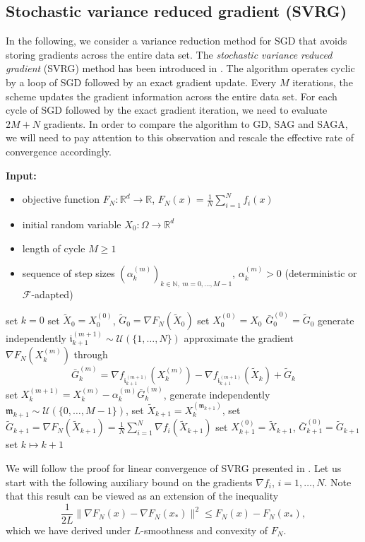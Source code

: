 \documentclass[12pt,openany]{book}
\theoremstyle{definition}
\theoremstyle{definition}
\newcommand{\cU}{\mathcal{U}}
\newcommand{\N}{\mathbb{N}}
\newcommand{\R}{\mathbb{R}}
\begin{document}
\subsection{Stochastic variance reduced gradient (SVRG) }

In the following, we consider a variance reduction method for SGD that avoids storing gradients across the entire data set. The \textit{stochastic variance reduced gradient} (SVRG) method has been introduced in \cite{NIPS2013_ac1dd209}. The algorithm operates cyclic by a loop of SGD followed by an exact gradient update. Every $M$ iterations, the scheme updates the gradient information across the entire data set. For each cycle of SGD followed by the exact gradient iteration, we need to evaluate $2M + N$ gradients. In order to compare the algorithm to GD, SAG and SAGA, we will need to pay attention to this observation and rescale the effective rate of convergence accordingly. 

\begin{algorithm}[htb!]
\begin{algorithmic}[1]
\State \textbf{Input:} \begin{itemize}
 \item objective function $F_N:\R^d\to\R$, $F_N(x) = \frac1N\sum_{i=1}^N f_i(x)$
 \item initial random variable $X_0:\Omega\to\R^d$
 \item length of cycle $M\ge1$
 \item sequence of step sizes $(\alpha_k^{(m)})_{k\in\N,\ m=0,\dots,M-1}$, $\alpha_k^{(m)}>0$ (deterministic or $\mathcal F$-adapted)
 \end{itemize}
 \State set $k=0$
 \State set $\tilde X_0 = X_0^{(0)}$, $\tilde G_0 = \nabla F_N(\tilde X_0)$ 
 \State set $X_0^{(0)} = X_0$ $\bar G_0^{(0)} = \tilde G_0$ 
		\State generate independently $\mathfrak i_{k+1}^{(m+1)} \sim \mathcal U(\{1,\dots,N\})$
		\State approximate the gradient $\nabla F_N(X_k^{(m)})$ through
		\[\bar G_k^{(m)} = \nabla f_{\mathfrak i_{k+1}^{(m+1)}}(X_k^{(m)}) - \nabla f_{\mathfrak i_{k+1}^{(m+1)}}(\tilde X_k) + \tilde G_k  \]
		\State set $X_{k}^{(m+1)} = X_k^{(m)} -\alpha_k^{(m)} \bar G_k^{(m)}$, 
	\EndFor
	\State generate independently $\mathfrak m_{k+1}\sim\cU(\{0,\dots,M-1\})$,
	\State set $\tilde X_{k+1} = X_k^{(\mathfrak m_{k+1})}$,
	\State set $\tilde G_{k+1} = \nabla F_N(\tilde X_{k+1}) = \frac1N \sum_{i=1}^N \nabla f_i(\tilde X_{k+1})$
	\State set $X_{k+1}^{(0)} = \tilde X_{k+1}$, $\bar G_{k+1}^{(0)} = \tilde G_{k+1}$
	\State set $k \mapsto k+1$
\EndWhile
\end{algorithmic}
 \caption{Stochastic variance reduced gradient method (SVRG)}\label{alg:SVRG}
\end{algorithm}
We will follow the proof for linear convergence of SVRG presented in \cite{NIPS2013_ac1dd209}. Let us start with the following auxiliary bound on the gradients $\nabla f_i$, $i=1,\dots,N$. Note that this result can be viewed as an extension of the inequality
\[\frac1{2L}\|\nabla F_N(x)- \nabla F_N(x_\ast)\|^2\le F_N(x)-F_N(x_\ast),\]
which we have derived under $L$-smoothness and convexity of $F_N$.
\end{document}
